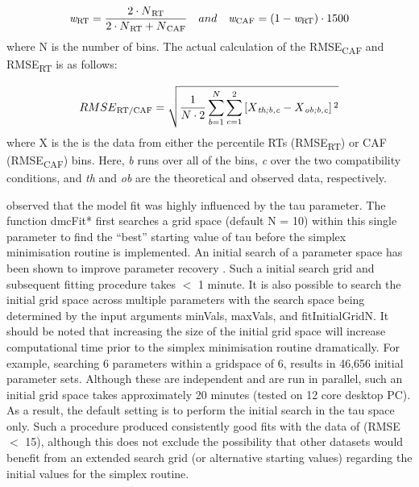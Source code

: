 \begin{equation*}
    \textit{w}\textsubscript{RT} = \frac{2 \cdot N\textsubscript{RT}} {2 \cdot N\textsubscript{RT} + N\textsubscript{CAF}} \quad and \quad  \textit{w}\textsubscript{CAF} = (1 - \textit{w}\textsubscript{RT}) \cdot 1500
\end{equation*}
where N is the number of bins. The actual calculation of the RMSE\textsubscript{CAF} and
RMSE\textsubscript{RT} is as follows:

\begin{equation*}
    RMSE\textsubscript{RT/CAF} = \sqrt{\frac{1}{N\cdot2} \sum_{b=1}^{N} \sum_{c=1}^{2} \left[X\textsubscript{\textit{th;b,c}} - X\textsubscript{\textit{ob;b,c}} \right] \textsuperscript{2}} 
\end{equation*}
where X is the is the data from either the percentile RTs
(RMSE\textsubscript{RT}) or CAF (RMSE\textsubscript{CAF}) bins. Here,
\textit{b} runs over all of the bins, \textit{c} over the two compatibility
conditions, and \textit{th} and \textit{ob} are the theoretical and observed
data, respectively. 

\textcite{ulrich2015automatic} observed that the model fit was highly
influenced by the tau parameter. The function dmcFit* first searches a grid
space (default N = 10) within this single parameter to find the ``best'' starting
value of tau before the simplex minimisation routine is implemented. An initial
search of a parameter space has been shown to improve parameter recovery
\parencite{hubnerimproving}. Such a initial search grid and subsequent fitting
procedure takes $<$ 1 minute. It is also possible to search the initial grid
space across multiple parameters with the search space being determined by the
input arguments minVals, maxVals, and fitInitialGridN. It should be noted that
increasing the size of the initial grid space will increase computational time
prior to the simplex minimisation routine dramatically. For example, searching
6 parameters within a gridspace of 6, results in 46,656 initial parameter sets.
Although these are independent and are run in parallel, such an initial grid
space takes approximately 20 minutes (tested on 12 core desktop PC). As a
result, the default setting is to perform the initial search in the tau space
only. Such a procedure produced consistently good fits with the data of
\textcite{ulrich2015automatic} (RMSE $<$ 15), although this does not exclude the
possibility that other datasets would benefit from an extended search grid (or
alternative starting values) regarding the initial values for the simplex
routine.



